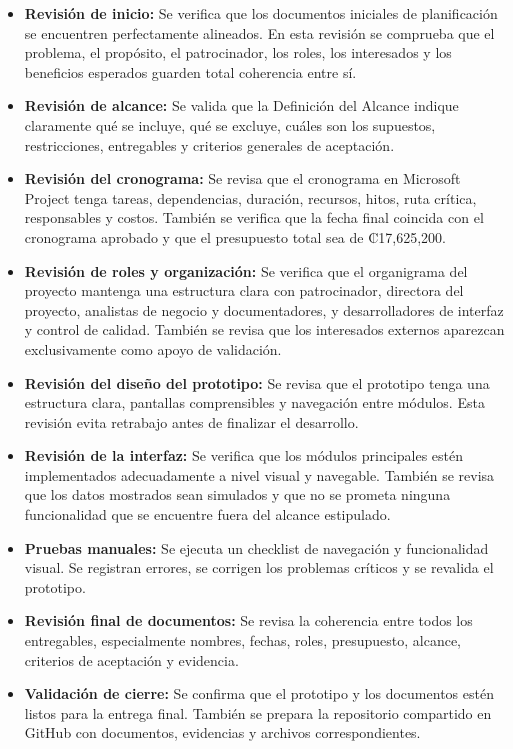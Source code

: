 \documentclass[11pt,spanish]{article}
\begin{document}
\begin{itemize}
    \item \textbf{Revisión de inicio:} Se verifica que los documentos iniciales de planificación se encuentren perfectamente alineados. En esta revisión se comprueba que el problema, el propósito, el patrocinador, los roles, los interesados y los beneficios esperados guarden total coherencia entre sí.
    \item \textbf{Revisión de alcance:} Se valida que la Definición del Alcance indique claramente qué se incluye, qué se excluye, cuáles son los supuestos, restricciones, entregables y criterios generales de aceptación.
    \item \textbf{Revisión del cronograma:} Se revisa que el cronograma en Microsoft Project tenga tareas, dependencias, duración, recursos, hitos, ruta crítica, responsables y costos. También se verifica que la fecha final coincida con el cronograma aprobado y que el presupuesto total sea de ₡17,625,200.
    \item \textbf{Revisión de roles y organización:} Se verifica que el organigrama del proyecto mantenga una estructura clara con patrocinador, directora del proyecto, analistas de negocio y documentadores, y desarrolladores de interfaz y control de calidad. También se revisa que los interesados externos aparezcan exclusivamente como apoyo de validación.
    \item \textbf{Revisión del diseño del prototipo:} Se revisa que el prototipo tenga una estructura clara, pantallas comprensibles y navegación entre módulos. Esta revisión evita retrabajo antes de finalizar el desarrollo.
    \item \textbf{Revisión de la interfaz:} Se verifica que los módulos principales estén implementados adecuadamente a nivel visual y navegable. También se revisa que los datos mostrados sean simulados y que no se prometa ninguna funcionalidad que se encuentre fuera del alcance estipulado.
    \item \textbf{Pruebas manuales:} Se ejecuta un checklist de navegación y funcionalidad visual. Se registran errores, se corrigen los problemas críticos y se revalida el prototipo.
    \item \textbf{Revisión final de documentos:} Se revisa la coherencia entre todos los entregables, especialmente nombres, fechas, roles, presupuesto, alcance, criterios de aceptación y evidencia.
    \item \textbf{Validación de cierre:} Se confirma que el prototipo y los documentos estén listos para la entrega final. También se prepara la repositorio compartido en GitHub con documentos, evidencias y archivos correspondientes.
\end{itemize}
\end{document}
